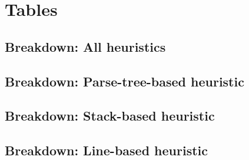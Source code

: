 \documentclass[sigplan,screen]{acmart}\settopmatter{printfolios=true,printccs=false,printacmref=false}
\begin{document}


\appendix

\section{Tables}
\label{apdx:tables}

\subsection{Breakdown: All heuristics}

\subsection{Breakdown: Parse-tree-based heuristic}

\subsection{Breakdown: Stack-based heuristic}

\subsection{Breakdown: Line-based heuristic}

\end{document}
